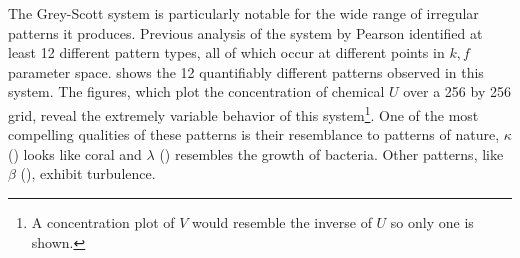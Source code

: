 The Grey-Scott system is particularly notable for the wide range of irregular patterns it produces. Previous analysis of the system by Pearson  identified at least 12 different pattern types, all of which occur at different points in $k, f$ parameter space.  shows the 12 quantifiably different patterns observed in this system. The figures, which plot the concentration of chemical $U$ over a 256 by 256 grid, reveal the extremely variable behavior of this system\footnote{A concentration plot of $V$ would resemble the inverse of $U$ so only one is shown.}. One of the most compelling qualities of these patterns is their resemblance to patterns of nature, \eg $\kappa$ () looks like coral and $\lambda$ () resembles the growth of bacteria. Other patterns, like $\beta$ (), exhibit turbulence.

